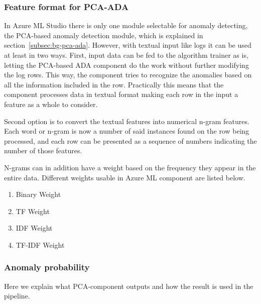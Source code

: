 

\subsubsection*{Feature format for PCA-ADA}
In Azure ML Studio
there is only one module selectable
for anomaly detecting,
the PCA-based anomaly detection module,
which is explained in section~\ref{subsec:bg-pca-ada}.
However,
with textual input like logs
it can be used at least in two ways.
First,
input data can be fed to
the algorithm trainer as is,
letting the PCA-based ADA component %
do the work without further modifying the log rows.
This way,
the component tries to recognize the anomalies
based on all the information included in the row.
Practically this means
that the component processes data in textual format
making each row in the input
a feature as a whole
to consider.

Second option is to
convert the textual features
into numerical n-gram features.
Each word or n-gram
is now a number of said instances found on
the row being processed,
and each row can be presented
as a sequence of numbers
indicating the number of those features.

N-grams can in addition have a weight
based on the frequency they appear
in the entire data.
Different weights usable in Azure ML component
are listed below.

\begin{enumerate}
    \item Binary Weight
    \item TF Weight
    \item IDF Weight
    \item TF-IDF Weight
\end{enumerate}


%


\subsubsection*{Anomaly probability}
\begin{itcomment}
    Here we explain what PCA-component outputs and how the result is used in the pipeline.
\end{itcomment}

